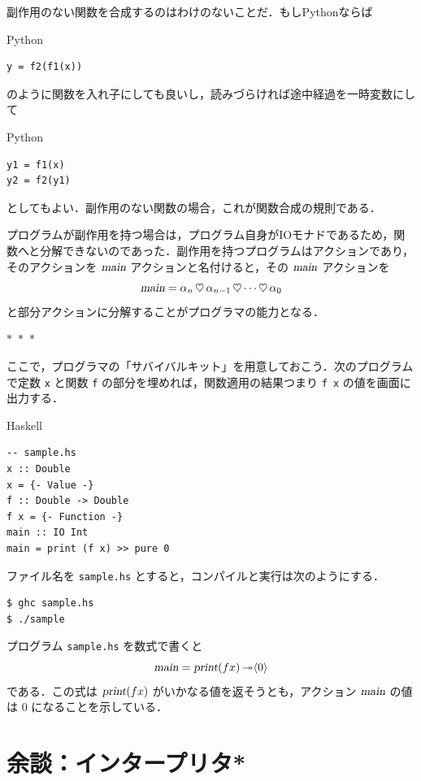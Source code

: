\documentclass[a4paper,twocolumn]{jsbook}
\newcommand{\separator}{\begin{center}$*$~$*$~$*$\end{center}}
\newcommand{\programminglanguage}[1]{\textsf{#1}}
\newcommand{\haskell}{\programminglanguage{Haskell}}
\newcommand{\python}{\programminglanguage{Python}}
\newcommand{\code}[1]{\texttt{#1}}
\newcommand{\filename}[1]{\texttt{#1}}
\newenvironment{haskellcode}{\begin{itembox}[r]{\haskell}}{\end{itembox}}
\newenvironment{pythoncode}{\begin{itembox}[r]{\python}}{\end{itembox}}
\newcommand{\mAction}[1]{\textsl{#1}}
\DeclareMathOperator{\mMain}{\mAction{main}}
\DeclareMathOperator{\mPrint}{\mAction{print}}
\DeclareMathOperator{\mBind}{\heartsuit}
\DeclareMathOperator{\mBindRightIgnore}{\twoheadrightarrow}
\newcommand{\mPureWith}[1]{\langle#1\rangle}
\begin{document}
副作用のない関数を合成するのはわけのないことだ．もし\python ならば
\begin{pythoncode}
\begin{verbatim}
y = f2(f1(x))
\end{verbatim}
\end{pythoncode}
のように関数を入れ子にしても良いし，読みづらければ途中経過を一時変数にして
\begin{pythoncode}
\begin{verbatim}
y1 = f1(x)
y2 = f2(y1)
\end{verbatim}
\end{pythoncode}
としてもよい．副作用のない関数の場合，これが関数合成の規則である．

プログラムが副作用を持つ場合は，プログラム自身がIOモナドであるため，関数へと分解できないのであった．副作用を持つプログラムはアクションであり，そのアクションを $\mMain$ アクションと名付けると，その $\mMain$ アクションを
\begin{equation}
\mMain=\alpha_n\mBind\alpha_{n-1}\mBind\dotsb\mBind\alpha_0
\end{equation}
と部分アクションに分解することがプログラマの能力となる．


\separator

ここで，プログラマの「サバイバルキット」を用意しておこう．次のプログラムで定数 \code{x} と関数 \code{f} の部分を埋めれば，関数適用の結果つまり \code{f x} の値を画面に出力する．
\begin{haskellcode}
\begin{verbatim}
-- sample.hs
x :: Double
x = {- Value -}
f :: Double -> Double
f x = {- Function -}
main :: IO Int
main = print (f x) >> pure 0
\end{verbatim}
\end{haskellcode}
ファイル名を \filename{sample.hs} とすると，コンパイルと実行は次のようにする．
\begin{verbatim}
$ ghc sample.hs
$ ./sample
\end{verbatim}%

プログラム \filename{sample.hs} を数式で書くと
\begin{equation}
\mMain=\mPrint(fx)\mBindRightIgnore\mPureWith{0}
\end{equation}
である．この式は $\mPrint(fx)$ がいかなる値を返そうとも，アクション $\mMain$ の値は $0$ になることを示している．


\section{余談：インタープリタ*}
\end{document}
